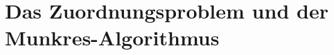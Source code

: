 %
%
%
\chapter{Das Zuordnungsproblem und der Munkres-Algorithmus\label{chapter:munkres}}
\begin{refsection}







\printbibliography[heading=subbibliography]
\end{refsection}
